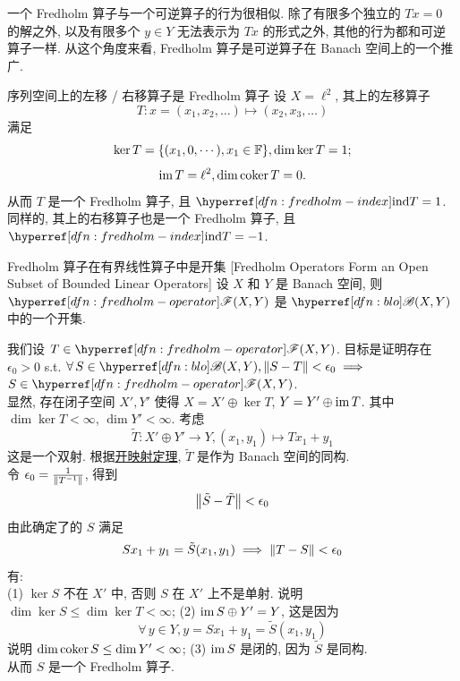         \begin{rmk}
            [Dedicatia]
            一个 Fredholm 算子与一个可逆算子的行为很相似. 除了有限多个独立的 \(Tx=0\) 的解之外, 以及有限多个 \(y\in Y\) 无法表示为 \(Tx\) 的形式之外, 其他的行为都和可逆算子一样. 从这个角度来看, Fredholm 算子是可逆算子在 Banach 空间上的一个推广.
        \end{rmk}

        \begin{ins}
            {序列空间上的左移 / 右移算子是 Fredholm 算子}
            设 \(X=\ell^2\), 其上的左移算子
            \[T: x=(x_1, x_2, \ldots) \mapsto (x_2, x_3, \ldots)\]
            满足
            \[\ker T=\{(x_1, 0, \cdots), x_1\in\operatorname{\mathbb{F}} \}, \dim\ker T = 1; \]
            \[\operatorname{im} T = \ell^2, \dim\operatorname{coker} T = 0.\]
            从而 \(T\) 是一个 Fredholm 算子, 且 \(\ind T = 1\). 同样的, 其上的右移算子也是一个 Fredholm 算子, 且 \(\ind T = -1\).
        \end{ins}

        \begin{thm}
            {Fredholm 算子在有界线性算子中是开集}
            [Fredholm Operators Form an Open Subset of Bounded Linear Operators]
            设 \(X\) 和 \(Y\) 是 Banach 空间, 则 \(\fred(X,Y)\) 是 \(\blo(X,Y)\) 中的一个开集. 
        \end{thm}

        \begin{prf}
            我们设 \(T\in\fred(X,Y)\). 目标是证明存在 \(\epsilon_0>0\) s.t. \(\forall\,S\in\blo(X,Y), \norm{S-T}<\epsilon_0\implies\) \(S\in\fred(X,Y)\). \\
            显然, 存在闭子空间 \(X',Y'\) 使得 \(X=X'\oplus\ker T\), \(Y=Y'\oplus\operatorname{im} T\). 其中 \(\dim\ker T<\infty\), \(\dim Y'<\infty\). 考虑 
            \[\tilde{T}: X'\oplus Y'\to Y, (x_1, y_1)\mapsto Tx_1+y_1\] 
            这是一个双射. 根据\hyperref[thm:omt]{开映射定理}, \(\tilde{T}\) 是作为 Banach 空间的同构. \\
            令 \(\epsilon_0=\frac{1}{\norm{T^{-1}}}\), 得到
            \[\norm{\tilde{S}-\tilde{T}}<\epsilon_0\]
            由此确定了的 \(S\) 满足
            \[Sx_1+y_1 = \tilde{S}(x_1, y_1)\implies \norm{T-S} < \epsilon_0\]
            有: \\
            (1) \(\ker S\) 不在 \(X'\) 中, 否则 \(S\) 在 \(X'\) 上不是单射. 说明 \(\dim\ker S\leq\dim\ker T < \infty\);
            (2) \(\operatorname{im} S\oplus Y'=Y\), 这是因为
            \[\forall\, y\in Y, y = Sx_1+y_1=\tilde{S} (x_1, y_1)\]
            说明 \(\dim\operatorname{coker} S\leq\dim Y' < \infty\);
            (3) \(\operatorname{im} S\) 是闭的, 因为 \(\tilde{S}\) 是同构.\\
            从而 \(S\) 是一个 Fredholm 算子.
        \end{prf}

